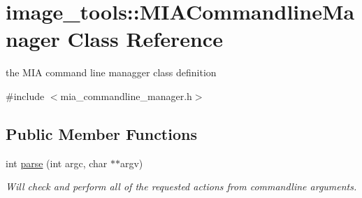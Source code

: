 \hypertarget{classimage__tools_1_1MIACommandlineManager}{}\section{image\+\_\+tools\+:\+:M\+I\+A\+Commandline\+Manager Class Reference}
\label{classimage__tools_1_1MIACommandlineManager}


the M\+IA command line managger class definition  




{\ttfamily \#include $<$mia\+\_\+commandline\+\_\+manager.\+h$>$}

\subsection*{Public Member Functions}
\begin{DoxyCompactItemize}
\item 
int \hyperlink{classimage__tools_1_1MIACommandlineManager_ad6bc053325dbe81667f85667dd1fdbf9}{parse} (int argc, char $\ast$$\ast$argv)
\begin{DoxyCompactList}\small\item\em Will check and perform all of the requested actions from commandline arguments. \end{DoxyCompactList}\end{DoxyCompactItemize}
